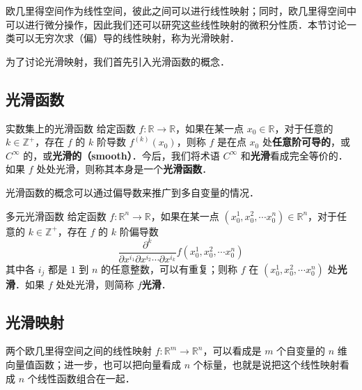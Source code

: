 

欧几里得空间作为线性空间，彼此之间可以进行线性映射；同时，欧几里得空间中可以进行微分操作，因此我们还可以研究这些线性映射的微积分性质．本节讨论一类可以无穷次求（偏）导的线性映射，称为光滑映射．

为了讨论光滑映射，我们首先引入光滑函数的概念．

\subsection{光滑函数}

\begin{definition}{实数集上的光滑函数}
给定函数 $f:\mathbb{R}\rightarrow\mathbb{R}$，如果在某一点 $x_0\in\mathbb{R}$，对于任意的 $k\in\mathbb{Z}^+$，存在 $f$ 的 $k$ 阶导数 $f^{(k)}(x_0)$，则称 $f$ 是在点 $x_0$ 处\textbf{任意阶可导的}，或 $C^\infty$ 的，或\textbf{光滑的（smooth）}．今后，我们将术语 $C^{\infty}$ 和\textbf{光滑}看成完全等价的．如果 $f$ 处处光滑，则称其本身是一个\textbf{光滑函数}．
\end{definition}

光滑函数的概念可以通过偏导数来推广到多自变量的情况．

\begin{definition}{多元光滑函数}
给定函数 $f:\mathbb{R}^n\rightarrow\mathbb{R}$，如果在某一点 $(x_0^1, x_0^2, \cdots x_0^n) \in\mathbb{R}^n$，对于任意的 $k\in\mathbb{Z}^+$，存在 $f$ 的 $k$ 阶偏导数$$\frac{\partial^k}{\partial x^{i_1}\partial x^{i_2}\cdots\partial x^{i_k}}f(x_0^1, x_0^2, \cdots x_0^n)$$其中各 $i_j$ 都是 $1$ 到 $n$ 的任意整数，可以有重复；则称 $f$ 在 $(x_0^1, x_0^2, \cdots x_0^n)$ 处\textbf{光滑}．如果 $f$ 处处光滑，则简称 $f$\textbf{光滑}．
\end{definition}

\subsection{光滑映射}

两个欧几里得空间之间的线性映射 $f:\mathbb{R}^m\rightarrow \mathbb{R}^n$，可以看成是 $m$ 个自变量的 $n$ 维向量值函数；进一步，也可以把向量看成 $n$ 个标量，也就是说把这个线性映射看成 $n$ 个线性函数组合在一起．

